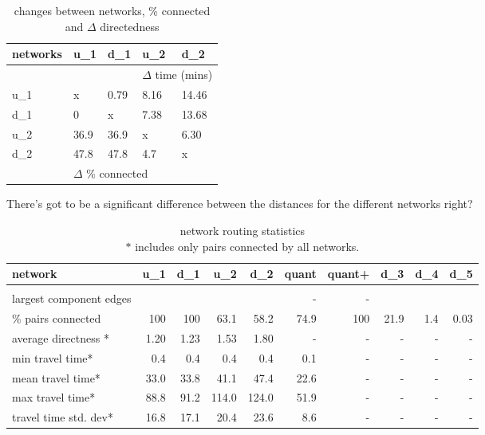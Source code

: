 \begin{table}
\centering
\begin{tabular}{@{}lllll@{}}
\toprule
networks & u\_1   & d\_1  & u\_2            & d\_2          \\ \midrule
         &        &       & \multicolumn{2}{l}{$\Delta$ time (mins)}  \\
u\_1     & x      &  0.79 & 8.16            & 14.46         \\
d\_1     & 0      & x     & 7.38            & 13.68         \\
u\_2     & 36.9   & 36.9  & x               & 6.30          \\
d\_2     & 47.8   & 47.8  & 4.7             & x             \\
         & \multicolumn{3}{l}{$\Delta$ \% connected} &               \\ \bottomrule
\end{tabular}
\caption{changes between networks, \% connected and $\Delta$ directedness}
\label{table:change between nets}
\end{table}

There's got to be a significant difference between the distances for the different networks right?


\begin{table}[]
\begin{tabular}{lrrrrrrrrr}
\toprule
network                  & u\_1    & d\_1    & u\_2  & d\_2  & quant & quant+ & d\_3 & d\_4 & d\_5 \\ \hline
                         &         &         &       &       &       &        &      &      &      \\
largest component edges  &         &         &       &       &  -    & -      &      &      &      \\
\% pairs connected       & 100     & 100     &  63.1 & 58.2  & 74.9  & 100    & 21.9 & 1.4  & 0.03 \\
average directness *     & 1.20    & 1.23    & 1.53  & 1.80  & -     & -      & -    & -    & -    \\
min travel time*         & 0.4     & 0.4     & 0.4   & 0.4   & 0.1   & -      & -    & -    & -    \\
mean travel time*        & 33.0    & 33.8    & 41.1  & 47.4  & 22.6  & -      & -    & -    & -    \\
max travel time*         & 88.8    & 91.2    & 114.0 & 124.0 & 51.9  & -      & -    & -    & -    \\
travel time std. dev*    & 16.8    & 17.1    & 20.4  & 23.6  & 8.6   & -      & -    & -    & -   \\ \bottomrule
\end{tabular}
\caption[caption]{network routing statistics \\ $*$ includes only pairs connected by all networks.}
\label{table:travel_time_stats}
\end{table}

